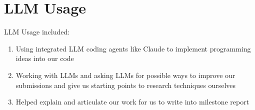 \documentclass{article}
\begin{document}
\section*{LLM Usage}
LLM Usage included:
\begin{enumerate}
    \item Using integrated LLM coding agents like Claude to implement programming ideas into our code
    \item Working with LLMs and asking LLMs for possible ways to improve our submissions and give us starting points to research techniques ourselves
    \item Helped explain and articulate our work for us to write into milestone report
\end{enumerate}




% 
% 
\end{document}
